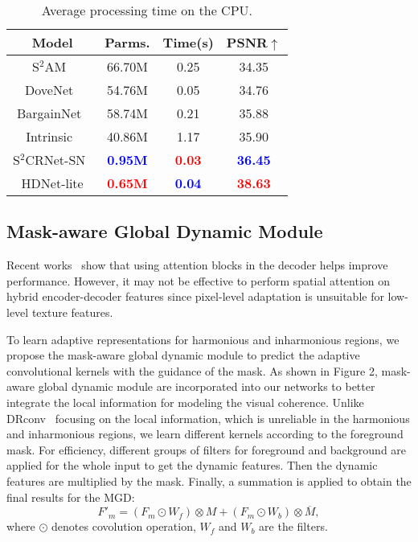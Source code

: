 \documentclass[sigconf]{acmart}
\begin{document}
\begin{table}[t]
	\centering
	\begin{tabular}{cccc}
		\toprule
		Model&Parms.&Time(s)&PSNR$\uparrow$\\\midrule
		S$^{2}$AM~\cite{SSAM}&66.70M&0.25&34.35 \\
		DoveNet~\cite{DoveNet}&54.76M&0.05&34.76\\         BargainNet~\cite{Bargainnet}&58.74M&0.21&35.88 \\ 
		Intrinsic~\cite{GuoZJGZ21} &40.86M&1.17&35.90 \\
		S$^2$CRNet-SN~\cite{liang2021spatial}&\textbf{\textcolor{blue}{0.95M}} &\textbf{\textcolor{red}{0.03}}&\textbf{\textcolor{blue}{36.45}}\\
		\midrule
		HDNet-lite&\textbf{\textcolor{red}{0.65M}}&\textbf{\textcolor{blue}{0.04}}&\textbf{\textcolor{red}{38.63}}\\
		\bottomrule
	\end{tabular}
	\caption{Average processing time on the CPU.}
\end{table}


\subsection{Mask-aware Global Dynamic Module}
Recent works~\cite{RAIN,Bargainnet,SSAM} show that using attention blocks in the decoder helps improve performance. However, it may not be effective to perform spatial attention on hybrid encoder-decoder features since pixel-level adaptation is unsuitable for low-level texture features. 

To learn adaptive representations for harmonious and inharmonious regions, we propose the mask-aware global dynamic module to predict the adaptive convolutional kernels with the guidance of the mask. As shown in Figure 2, mask-aware global dynamic module are incorporated into our networks to better integrate the local information for modeling the visual coherence. Unlike DRconv~\cite{drconv} focusing on the local information, which is unreliable in the harmonious and inharmonious regions, we learn different kernels according to the foreground mask. For efficiency, different groups of filters for foreground and background are applied for the whole input to get the dynamic features. Then the dynamic features are multiplied by the mask. Finally, a summation is applied to obtain the final results for the MGD:
\begin{equation}
	F'_m = (F_m\odot W_f )\otimes M + (F_m\odot W_b )\otimes \overline{M},
\end{equation}
where $\odot$ denotes covolution operation, $W_f$ and $W_b$ are the filters.
\end{document}
